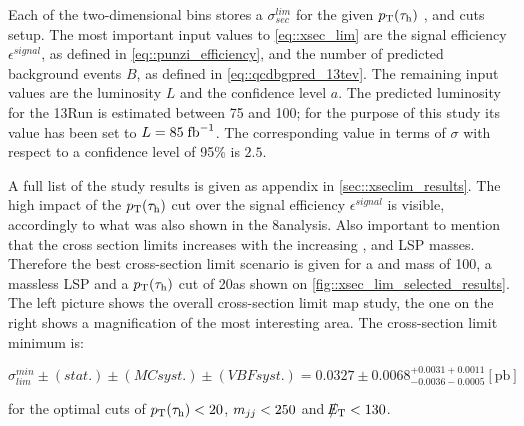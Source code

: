 Each of the two-dimensional bins stores a $\sigma^{lim}_{sec}$ for the given $p_{\text{T}}(\tau_{\text{h}})$ , \mjj and \met cuts setup. The most important input values to \autoref{eq::xsec_lim} are the signal efficiency $\epsilon^{signal}$, as defined in \autoref{eq::punzi_efficiency},  and the number of predicted background events $B$, as defined in \autoref{eq::qcdbgpred_13tev}. The remaining input values are the luminosity $L$ and the confidence level $a$. The predicted luminosity for the 13\tev Run \cite{Bruning:2002yh} is estimated between 75 and 100\invfb; for the purpose of this study its value has been set to $L = 85\;\text{fb}^{-1}$. The corresponding value in terms of $\sigma$ with respect to a confidence level of 95\%  is $2.5$.

A full list of the study results is given as appendix in \autoref{sec::xseclim_results}. The high impact of the $p_{\text{T}}(\tau_{\text{h}})$ cut over the signal efficiency $\epsilon^{signal}$ is visible, accordingly to what was also shown in the 8\tev analysis. Also important to mention that the cross section limits increases with the increasing \charginopm, \neutralinotwo and LSP masses. Therefore the best cross-section limit scenario is given for a \charginopm and \neutralinotwo mass of 100\gev, a massless LSP and a $p_{\text{T}}(\tau_{\text{h}})$ cut of 20\gev as shown on \autoref{fig::xsec_lim_selected_results}. The left picture shows the overall cross-section limit map study, the one on the right shows a magnification of the most interesting area. The cross-section limit minimum is:

\begin{equation}
\sigma_{lim}^{min}\pm(stat.)\pm(MC syst.)\pm(VBF syst.) = 0.0327\pm0.0068^{+0.0031+ 0.0011}_{-0.0036-0.0005} [\text{pb}]
\label{eq::xsec_lim_best_result}
\end{equation}

for the optimal cuts of  $p_{\text{T}}(\tau_{\text{h}}) <  20$,  $ m_{jj}< 250 $ and $\slash\mkern-12mu{E}_{\text{T}} < 130$.

